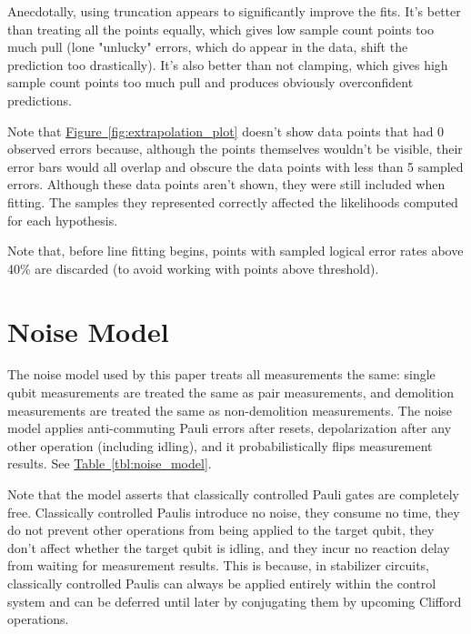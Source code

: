 \documentclass[onecolumn,unpublished,a4paper]{quantumarticle}
\theoremstyle{definition}
\theoremstyle{definition}
\theoremstyle{definition}
\newcommand{\fig}[1]{\hyperref[fig:#1]{Figure~\ref*{fig:#1}}}
\newcommand{\tbl}[1]{\hyperref[tbl:#1]{Table~\ref*{tbl:#1}}}
\begin{document}
Anecdotally, using truncation appears to significantly improve the fits.
It's better than treating all the points equally, which gives low sample count points too much pull (lone "unlucky" errors, which do appear in the data, shift the prediction too drastically).
It's also better than not clamping, which gives high sample count points too much pull and produces obviously overconfident predictions.

Note that \fig{extrapolation_plot} doesn't show data points that had 0 observed errors because, although the points themselves wouldn't be visible, their error bars would all overlap and obscure the data points with less than 5 sampled errors.
Although these data points aren't shown, they were still included when fitting.
The samples they represented correctly affected the likelihoods computed for each hypothesis.

Note that, before line fitting begins, points with sampled logical error rates above 40\% are discarded (to avoid working with points above threshold).

\clearpage
\section{Noise Model}
\label{app:noise_model}

The noise model used by this paper treats all measurements the same: single qubit measurements are treated the same as pair measurements, and demolition measurements are treated the same as non-demolition measurements.
The noise model applies anti-commuting Pauli errors after resets, depolarization after any other operation (including idling), and it probabilistically flips measurement results.
See \tbl{noise_model}.

Note that the model asserts that classically controlled Pauli gates are completely free.
Classically controlled Paulis introduce no noise, they consume no time, they do not prevent other operations from being applied to the target qubit, they don't affect whether the target qubit is idling, and they incur no reaction delay from waiting for measurement results.
This is because, in stabilizer circuits, classically controlled Paulis can always be applied entirely within the control system and can be deferred until later by conjugating them by upcoming Clifford operations.
\end{document}

